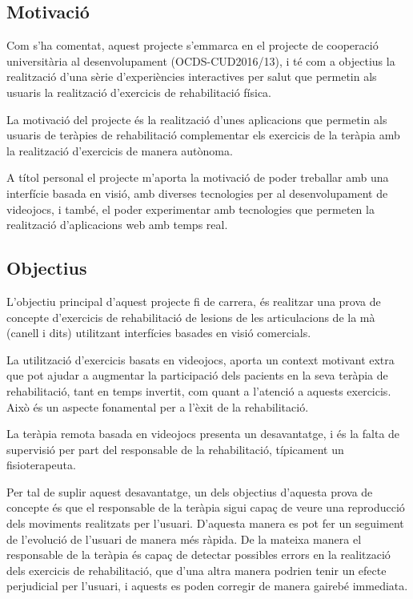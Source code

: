 \documentclass[12pt,a4paper,catalan]{article}
\begin{document}
	\subsection{Motivació}
	Com s'ha comentat, aquest projecte s'emmarca en el projecte de cooperació universitària al desenvolupament (OCDS-CUD2016/13), i té com a objectius la realització d'una sèrie d'experiències interactives per salut que permetin als usuaris la realització d'exercicis de rehabilitació física.
	
	La motivació del projecte és la realització d'unes aplicacions que permetin als usuaris de teràpies de rehabilitació complementar els exercicis de la teràpia amb la realització d'exercicis de manera autònoma.
	
	A títol personal el projecte m'aporta la motivació de poder treballar amb una interfície basada en visió, amb diverses tecnologies per al desenvolupament de videojocs, i també, el poder experimentar amb tecnologies que permeten la realització d'aplicacions web amb temps real.
	\subsection{Objectius}
	L'objectiu principal d'aquest projecte fi de carrera, és realitzar una prova de concepte d'exercicis de rehabilitació de lesions de les articulacions de la mà (canell i dits) utilitzant interfícies basades en visió comercials.
	
	La utilització d'exercicis basats en videojocs, aporta un context motivant extra que pot ajudar a augmentar la participació dels pacients en la seva teràpia de rehabilitació, tant en temps invertit, com quant a l'atenció a aquests exercicis. Això és un aspecte fonamental per a l'èxit de la rehabilitació.
	
	La teràpia remota basada en videojocs presenta un desavantatge, i és la falta de supervisió per part del responsable de la rehabilitació, típicament un fisioterapeuta.
	
	Per tal de suplir aquest desavantatge, un dels objectius d'aquesta prova de concepte és que el responsable de la teràpia sigui capaç de veure una reproducció dels moviments realitzats per l'usuari. D'aquesta manera es pot fer un seguiment de l'evolució de l'usuari de manera més ràpida. De la mateixa manera el responsable de la teràpia és capaç de detectar possibles errors en la realització dels exercicis de rehabilitació, que d'una altra manera podrien tenir un efecte perjudicial per l'usuari, i aquests es poden corregir de manera gairebé immediata.
	
\end{document}
